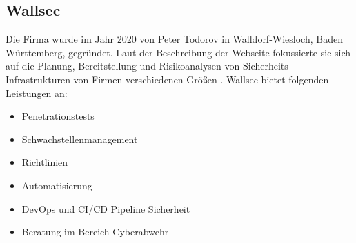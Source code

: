 \subsection{Wallsec}
Die Firma wurde im Jahr 2020 von Peter Todorov in Walldorf-Wiesloch, Baden Württemberg, gegründet. Laut der Beschreibung der Webseite fokussierte sie sich auf die Planung, Bereitstellung und Risikoanalysen von Sicherheits-Infrastrukturen von Firmen verschiedenen Größen \citep{Wallsec}. Wallsec bietet folgenden Leistungen an:

\begin{itemize}
   \item Penetrationstests
   \item Schwachstellenmanagement
   \item Richtlinien
   \item Automatisierung
   \item DevOps und CI/CD Pipeline Sicherheit
   \item Beratung im Bereich Cyberabwehr
\end{itemize}








